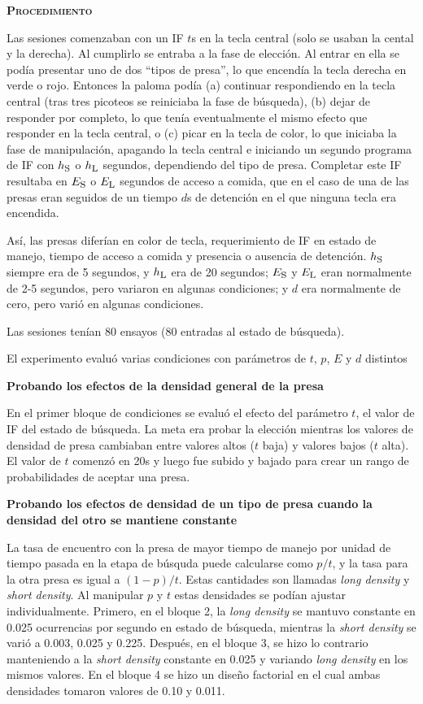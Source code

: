 \documentclass[a4paper,12pt]{article}
\begin{document}
{\scshape\bfseries Procedimiento}

Las sesiones comenzaban con un IF $t$s en la tecla central (solo se usaban la cental y la derecha). Al cumplirlo se entraba a la fase de elección. Al entrar en ella se podía presentar uno de dos ``tipos de presa'', lo que encendía la tecla derecha en verde o rojo. Entonces la paloma podía (a) continuar respondiendo en la tecla central (tras tres picoteos se reiniciaba la fase de búsqueda), (b) dejar de responder por completo, lo que tenía eventualmente el mismo efecto que responder en la tecla central, o (c) picar en la tecla de color, lo que iniciaba la fase de manipulación, apagando la tecla central e iniciando un segundo programa de IF con $h_{\mbox{\footnotesize S}}$ o $h_{\mbox{\footnotesize L}}$ segundos, dependiendo del tipo de presa. Completar este IF resultaba en $E_{\mbox{\footnotesize S}}$ o $E_{\mbox{\footnotesize L}}$ segundos de acceso a comida, que en el caso de una de las presas eran seguidos de un tiempo $d$s de detención en el que ninguna tecla era encendida.

Así, las presas diferían en color de tecla, requerimiento de IF en estado de manejo, tiempo de acceso a comida y presencia o ausencia de detención. $h_{\mbox{\footnotesize S}}$ siempre era de 5 segundos, y $h_{\mbox{\footnotesize L}}$ era de 20 segundos; $E_{\mbox{\footnotesize S}}$ y $E_{\mbox{\footnotesize L}}$ eran normalmente de 2-5 segundos, pero variaron en algunas condiciones; y $d$ era normalmente de cero, pero varió en algunas condiciones.

Las sesiones tenían 80 ensayos (80 entradas al estado de búsqueda).

El experimento evaluó varias condiciones con parámetros de $t$, $p$, $E$ y $d$ distintos

{\bfseries Probando los efectos de la densidad general de la presa}

En el primer bloque de condiciones se evaluó el efecto del parámetro $t$, el valor de IF del estado de búsqueda. La meta era probar la elección mientras los valores de densidad de presa cambiaban entre valores altos ($t$ baja) y valores bajos ($t$ alta). El valor de $t$ comenzó en 20s y luego fue subido y bajado para crear un rango de probabilidades de aceptar una presa.

{\bfseries Probando los efectos de densidad de un tipo de presa cuando la densidad del otro se mantiene constante}

La tasa de encuentro con la presa de mayor tiempo de manejo por unidad de tiempo pasada en la etapa de búsquda puede calcularse como $p/t$, y la tasa para la otra presa es igual a $(1-p)/t$. Estas cantidades son llamadas {\slshape long density} y {\slshape short density}. Al manipular $p$ y $t$ estas densidades se podían ajustar individualmente. Primero, en el bloque 2, la {\slshape long density} se mantuvo constante en 0.025 ocurrencias por segundo en estado de búsqueda, mientras la {\slshape short density} se varió a 0.003, 0.025 y 0.225. Después, en el bloque 3, se hizo lo contrario manteniendo a la {\slshape short density} constante en 0.025 y variando {\slshape long density} en los mismos valores.
En el bloque 4 se hizo un diseño factorial en el cual ambas densidades tomaron valores de 0.10 y 0.011.
\end{document}

